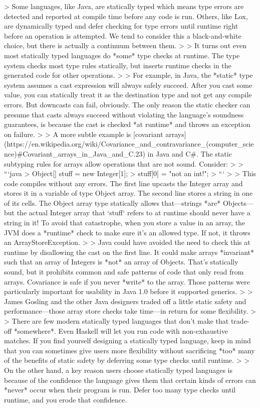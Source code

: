 \documentclass[cn,11pt,chinese]{elegantbook}
\begin{document}
{{{> Some languages, like Java, are statically typed which means type errors are detected and reported at compile time before any code is run. Others, like Lox, are dynamically typed and defer checking for type errors until runtime right before an operation is attempted. We tend to consider this a black-and-white choice, but there is actually a continuum between them.
>
> It turns out even most statically typed languages do *some* type checks at runtime. The type system checks most type rules statically, but inserts runtime checks in the generated code for other operations.
>
> For example, in Java, the *static* type system assumes a cast expression will always safely succeed. After you cast some value, you can statically treat it as the destination type and not get any compile errors. But downcasts can fail, obviously. The only reason the static checker can presume that casts always succeed without violating the language’s soundness guarantees, is because the cast is checked *at runtime* and throws an exception on failure.
>
> A more subtle example is [covariant arrays](https://en.wikipedia.org/wiki/Covariance_and_contravariance_(computer_science)#Covariant_arrays_in_Java_and_C.23) in Java and C#. The static subtyping rules for arrays allow operations that are not sound. Consider:
>
> ```java
> Object[] stuff = new Integer[1];
> stuff[0] = "not an int!";
> ```
>
> This code compiles without any errors. The first line upcasts the Integer array and stores it in a variable of type Object array. The second line stores a string in one of its cells. The Object array type statically allows that—strings *are* Objects—but the actual Integer array that `stuff` refers to at runtime should never have a string in it! To avoid that catastrophe, when you store a value in an array, the JVM does a *runtime* check to make sure it’s an allowed type. If not, it throws an ArrayStoreException.
>
> Java could have avoided the need to check this at runtime by disallowing the cast on the first line. It could make arrays *invariant* such that an array of Integers is *not* an array of Objects. That’s statically sound, but it prohibits common and safe patterns of code that only read from arrays. Covariance is safe if you never *write* to the array. Those patterns were particularly important for usability in Java 1.0 before it supported generics.
>
> James Gosling and the other Java designers traded off a little static safety and performance—those array store checks take time—in return for some flexibility.
>
> There are few modern statically typed languages that don’t make that trade-off *somewhere*. Even Haskell will let you run code with non-exhaustive matches. If you find yourself designing a statically typed language, keep in mind that you can sometimes give users more flexibility without sacrificing *too* many of the benefits of static safety by deferring some type checks until runtime.
>
> On the other hand, a key reason users choose statically typed languages is because of the confidence the language gives them that certain kinds of errors can *never* occur when their program is run. Defer too many type checks until runtime, and you erode that confidence.

}}}
\end{document}
